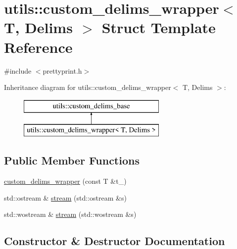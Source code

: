 \hypertarget{structutils_1_1custom__delims__wrapper}{}\section{utils\+::custom\+\_\+delims\+\_\+wrapper$<$ T, Delims $>$ Struct Template Reference}
\label{structutils_1_1custom__delims__wrapper}


{\ttfamily \#include $<$prettyprint.\+h$>$}

Inheritance diagram for utils\+::custom\+\_\+delims\+\_\+wrapper$<$ T, Delims $>$\+:\begin{figure}[H]
\begin{center}
\leavevmode
\includegraphics[height=2.000000cm]{d6/dcc/structutils_1_1custom__delims__wrapper}
\end{center}
\end{figure}
\subsection*{Public Member Functions}
\begin{DoxyCompactItemize}
\item 
\mbox{\hyperlink{structutils_1_1custom__delims__wrapper_ac9b1729fe2eb408891bbe6ebf5ff9624}{custom\+\_\+delims\+\_\+wrapper}} (const T \&t\+\_\+)
\item 
std\+::ostream \& \mbox{\hyperlink{structutils_1_1custom__delims__wrapper_a67631c11d4de7ba45a69e402fb62b4b8}{stream}} (std\+::ostream \&s)
\item 
std\+::wostream \& \mbox{\hyperlink{structutils_1_1custom__delims__wrapper_ae2079ff077884404ebf307ff293630cc}{stream}} (std\+::wostream \&s)
\end{DoxyCompactItemize}


\subsection{Constructor \& Destructor Documentation}
\mbox{\label{structutils_1_1custom__delims__wrapper_ac9b1729fe2eb408891bbe6ebf5ff9624}} 
